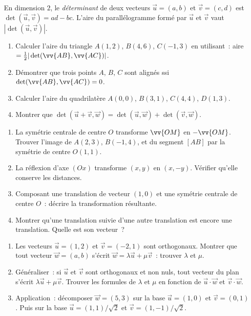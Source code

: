 \begin{challenge}
En dimension $2$, le \emph{d\'eterminant} de deux vecteurs
$\vec{u}=(a,b)$ et $\vec{v}=(c,d)$ est $\det(\vec{u},\vec{v})=ad-bc$.
L'aire du parall\'elogramme form\'e par $\vec{u}$ et $\vec{v}$
vaut $|\det(\vec{u},\vec{v})|$.
\begin{enumerate}
  \item Calculer l'aire du triangle $A(1,2)$, $B(4,6)$, $C(-1,3)$
        en utilisant~: aire $= \frac{1}{2}|\det(\vv{AB},\vv{AC})|$.
  \item D\'emontrer que trois points $A$, $B$, $C$ sont align\'es ssi
        $\det(\vv{AB},\vv{AC})=0$.
  \item Calculer l'aire du quadrilat\`ere $A(0,0)$, $B(3,1)$, $C(4,4)$, $D(1,3)$.
  \item Montrer que $\det(\vec{u}+\vec{v},\vec{w}) = \det(\vec{u},\vec{w})+\det(\vec{v},\vec{w})$.
\end{enumerate}
\end{challenge}

\begin{challenge}
\begin{enumerate}
  \item La sym\'etrie centrale de centre $O$ transforme $\vv{OM}$ en $-\vv{OM}$.
        Trouver l'image de $A(2,3)$, $B(-1,4)$, et du segment $[AB]$
        par la sym\'etrie de centre $O(1,1)$.
  \item La r\'eflexion d'axe $(Ox)$ transforme $(x,y)$ en $(x,-y)$.
        V\'erifier qu'elle conserve les distances.
  \item Composant une translation de vecteur $(1,0)$ et une sym\'etrie centrale
        de centre $O$~: d\'ecrire la transformation r\'esultante.
  \item Montrer qu'une translation suivie d'une autre translation est encore
        une translation. Quelle est son vecteur~?
\end{enumerate}
\end{challenge}

\begin{challenge}
\begin{enumerate}
  \item Les vecteurs $\vec{u}=(1,2)$ et $\vec{v}=(-2,1)$ sont orthogonaux.
        Montrer que tout vecteur $\vec{w}=(a,b)$ s'\'ecrit
        $\vec{w}=\lambda\vec{u}+\mu\vec{v}$~: trouver $\lambda$ et $\mu$.
  \item G\'en\'eraliser~: si $\vec{u}$ et $\vec{v}$ sont orthogonaux et non nuls,
        tout vecteur du plan s'\'ecrit $\lambda\vec{u}+\mu\vec{v}$.
        Trouver les formules de $\lambda$ et $\mu$ en fonction de
        $\vec{u}\cdot\vec{w}$ et $\vec{v}\cdot\vec{w}$.
  \item Application~: d\'ecomposer $\vec{w}=(5,3)$ sur la base $\vec{u}=(1,0)$
        et $\vec{v}=(0,1)$. Puis sur la base $\vec{u}=(1,1)/\sqrt{2}$
        et $\vec{v}=(1,-1)/\sqrt{2}$.
\end{enumerate}
\end{challenge}

